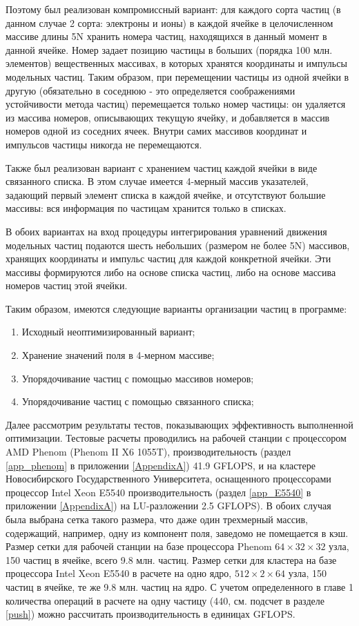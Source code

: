 Поэтому был реализован компромиссный вариант: для каждого сорта частиц (в данном случае 2 сорта: электроны и ионы) в каждой ячейке в целочисленном массиве длины 5N хранить номера частиц, находящихся в данный момент в данной ячейке. Номер задает позицию частицы в больших (порядка 100 млн. элементов) вещественных массивах, в которых хранятся координаты и импульсы модельных частиц. Таким образом, при перемещении частицы из одной ячейки в другую (обязательно в соседнюю - это определяется соображениями устойчивости метода частиц) перемещается только номер частицы: он удаляется из массива номеров, описывающих текущую ячейку, и добавляется в массив номеров одной из соседних ячеек. Внутри самих массивов координат и импульсов частицы никогда не перемещаются. 

Также был реализован вариант с хранением частиц каждой ячейки в виде связанного списка. В этом случае имеется 4-мерный массив указателей, задающий первый элемент списка в каждой ячейке, и отсутствуют большие массивы: вся информация по частицам хранится только в списках. 

В обоих вариантах на вход процедуры интегрирования уравнений движения модельных частиц подаются шесть небольших (размером не более 5N) массивов, хранящих координаты и импульс частиц для каждой конкретной ячейки. Эти массивы формируются либо на основе списка частиц, либо на основе массива номеров частиц этой ячейки. 

Таким образом, имеются следующие варианты организации частиц в программе:
\begin{enumerate}
	\item Исходный неоптимизированный вариант; 
	\item Хранение значений поля в 4-мерном массиве; 
	\item Упорядочивание частиц с помощью массивов номеров; 
	\item Упорядочивание частиц с помощью связанного списка; 
\end{enumerate}

Далее рассмотрим результаты тестов, показывающих эффективность выполненной оптимизации. Тестовые расчеты проводились на рабочей станции с процессором AMD Phenom (Phenom II X6 1055T),  производительность (раздел  \ref{app_phenom} в приложении \ref{AppendixA}) 41.9 GFLOPS, и на кластере Новосибирского Государственного Университета, оснащенного процессорами процессор Intel Xeon  E5540 производительность (раздел \ref{app_E5540} в приложении \ref{AppendixA}) на LU-разложении 2.5 GFLOPS). В обоих случая была выбрана сетка такого размера, что даже один трехмерный массив, содержащий, например, одну из компонент поля, заведомо не помещается в кэш. 
Размер сетки для рабочей станции на базе процессора Phenom  $64\times32\times32$ узла, 150 частиц в ячейке, всего 9.8 млн. частиц. Размер сетки для кластера на базе процессора Intel Xeon  E5540 в расчете на одно ядро, $512\times2\times64$ узла, 150 частиц в ячейке, те же 9.8 млн. частиц на ядро. С учетом определенного в главе 1 количества операций в расчете на одну частицу (440, см. подсчет в разделе \ref{push}) можно рассчитать производительность в единицах GFLOPS.

